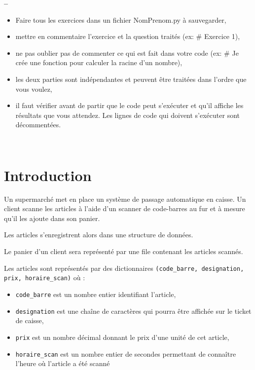 

\begin{center}
{\Large\bf {\type} \no {\numero} -- \descrip}
\end{center}


\hspace{-1cm}
\begin{boxedminipage}{\textwidth} 
\begin{itemize}
 \item Faire tous les exercices dans un fichier {NomPrenom.py} à sauvegarder,
 \item mettre en commentaire l'exercice et la question traités (ex: \# Exercice 1),
 \item ne pas oublier pas de commenter ce qui est fait dans votre code (ex: \# Je crée une fonction pour calculer la racine d'un nombre),
 \item les deux parties sont indépendantes et peuvent être traitées dans l'ordre que vous voulez,
 \item il faut vérifier avant de partir que le code peut s'exécuter et qu'il affiche les résultats que vous attendez. Les lignes de code qui doivent s'exécuter sont décommentées.
\end{itemize}
\end{boxedminipage}

~\

\section*{Introduction}

Un supermarché met en place un système de passage automatique en caisse.
Un client scanne les articles à l’aide d’un scanner de code-barres au fur et à mesure qu’il les ajoute dans son panier.

Les articles s’enregistrent alors dans une structure de données.

Le panier d’un client sera représenté par une file contenant les articles scannés.

Les articles sont représentés par des dictionnaires \texttt{(code\_barre, designation, prix, horaire\_scan)} où :
\begin{itemize}
 \item \texttt{code\_barre} est un nombre entier identifiant l’article,
 \item \texttt{designation} est une chaîne de caractères qui pourra être affichée sur le ticket de caisse,
 \item \texttt{prix} est un nombre décimal donnant le prix d’une unité de cet article,
 \item \texttt{horaire\_scan} est un nombre entier de secondes permettant de connaître l’heure où l’article a été scanné
\end{itemize}

